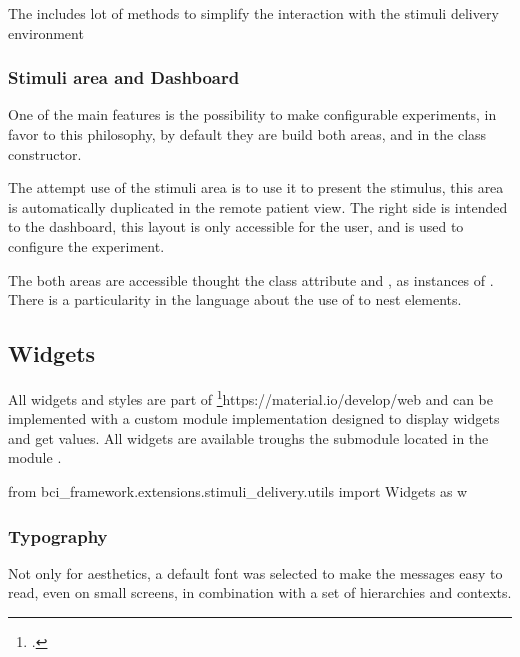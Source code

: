 

The  includes lot of methods to simplify the interaction with the stimuli delivery environment


\subsubsection{Stimuli area and Dashboard}

One of the main features is the possibility to make configurable experiments, in favor to this philosophy, by default they are build both areas,  and  in the class constructor.

% 
% 

The attempt use of the stimuli area is to use it to present the stimulus, this area is automatically duplicated in the remote patient view. The right side is intended to the dashboard, this layout is only accessible for the user, and is used to configure the experiment.

The both areas are accessible thought the class attribute  and , as instances of . There is a particularity in the language about the use of \quot{<=} to nest elements.


\subsection{Widgets}

All widgets and styles are part of \footcite{Material Components Web}{https://material.io/develop/web} and can be implemented with a custom module implementation designed to display widgets and get values. All widgets are available troughs the  submodule located in the module .

\begin{python}
from bci_framework.extensions.stimuli_delivery.utils import Widgets as w
\end{python}

\subsubsection{Typography}
Not only for aesthetics, a default font was selected to make the messages easy to read, even on small screens, in combination with a set of hierarchies and contexts.


